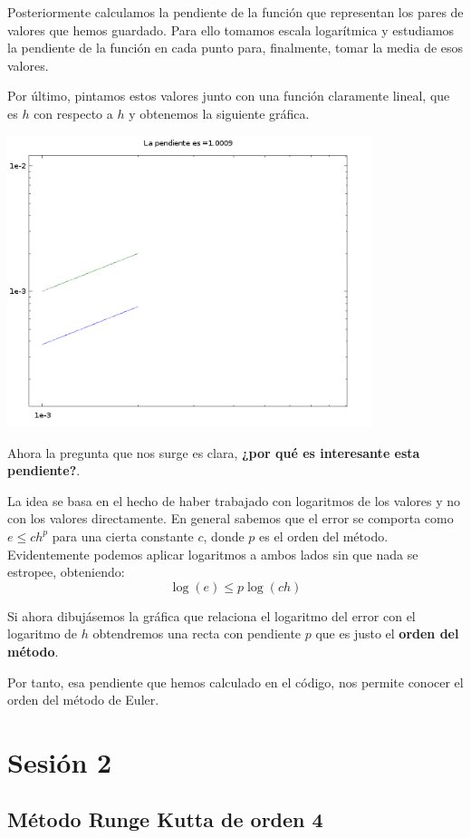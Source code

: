 Posteriormente calculamos la pendiente de la función que representan los pares de valores que hemos guardado. Para ello tomamos escala logarítmica y estudiamos la pendiente de la función en cada punto para, finalmente, tomar la media de esos valores.

Por último, pintamos estos valores junto con una función claramente lineal, que es $h$ con respecto a $h$ y obtenemos la siguiente gráfica.

\begin{center}
\includegraphics[width=0.8\textwidth]{img/figure2.png}
\end{center}

Ahora la pregunta que nos surge es clara, \textbf{¿por qué es interesante esta pendiente?}.

La idea se basa en el hecho de haber trabajado con logaritmos de los valores y no con los valores directamente. En general sabemos que el error se comporta como $e \leq c h^p$ para una cierta constante $c$, donde $p$ es el orden del método. Evidentemente podemos aplicar logaritmos a ambos lados sin que nada se estropee, obteniendo:
\[\log(e) \leq p \log(ch)\]

Si ahora dibujásemos la gráfica que relaciona el logaritmo del error con el logaritmo de $h$ obtendremos una recta con pendiente $p$ que es justo el \textbf{orden del método}.

Por tanto, esa pendiente que hemos calculado en el código, nos permite conocer el orden del método de Euler.

\section{Sesión 2}
\subsection{Método Runge Kutta de orden 4}
